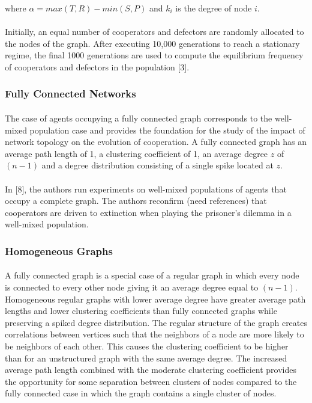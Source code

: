 \documentclass{article}
\begin{document}
    where $\alpha=max(T,R)-min(S,P)$ and $k_i$ is the degree of node $i$.

    \paragraph{}Initially, an equal number of cooperators and defectors are randomly allocated to the nodes of the graph.  After executing 10,000 generations to reach a stationary regime, the final 1000 generations are used to compute the equilibrium frequency of cooperators and defectors in the population [3].

    \subsubsection{Fully Connected Networks}
    \paragraph{}The case of agents occupying a fully connected graph corresponds to the well-mixed population case and provides the foundation for the study of the impact of network topology on the evolution of cooperation.  A fully connected graph has an average path length of 1, a clustering coefficient of 1, an average degree $z$ of $(n-1)$ and a degree distribution consisting of a single spike located at $z$.
    \paragraph{} In [8], the authors run experiments on well-mixed populations of agents that occupy a complete graph.  The authors reconfirm (need references) that cooperators are driven to extinction when playing the prisoner’s dilemma in a well-mixed population.
    
    \subsubsection{Homogeneous Graphs}
    \paragraph{}A fully connected graph is a special case of a regular graph in which every node is connected to every other node giving it an average degree equal to $(n-1)$.   Homogeneous regular graphs with lower average degree have greater average path lengths and lower clustering coefficients than fully connected graphs while preserving a spiked degree distribution.  The regular structure of the graph creates correlations between vertices such that the neighbors of a node are more likely to be neighbors of each other.  This causes the clustering coefficient to be higher than for an unstructured graph with the same average degree.  The increased average path length combined with the moderate clustering coefficient provides the opportunity for some separation between clusters of nodes compared to the fully connected case in which the graph contains a single cluster of nodes.
\end{document}
